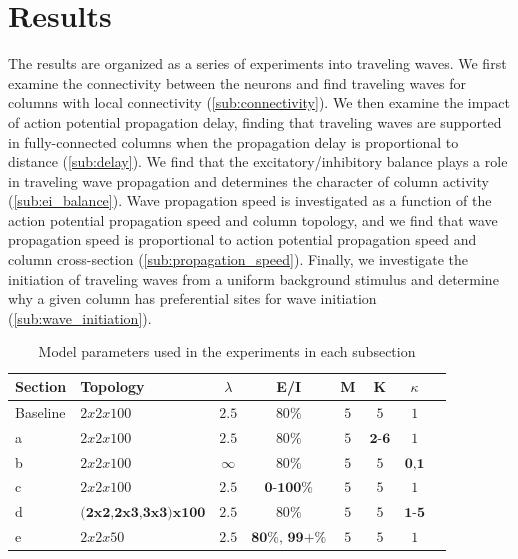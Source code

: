 \documentclass[a4paper,11pt]{article}
\begin{document}
\section{Results}
The results are organized as a series of experiments into traveling waves.
We first examine the connectivity between the neurons and find traveling waves for columns with local connectivity (\ref{sub:connectivity}).
We then examine the impact of action potential propagation delay, finding that traveling waves are supported in fully-connected columns when the propagation delay is proportional to distance (\ref{sub:delay}).
We find that the excitatory/inhibitory balance plays a role in traveling wave propagation and determines the character of column activity (\ref{sub:ei_balance}).
Wave propagation speed is investigated as a function of the action potential propagation speed and column topology, and we find that wave propagation speed is proportional to action potential propagation speed and column cross-section (\ref{sub:propagation_speed}).
Finally, we investigate the initiation of traveling waves from a uniform background stimulus and determine why a given column has preferential sites for wave initiation (\ref{sub:wave_initiation}).

\begin{table}[!htb]
 \caption{Model parameters used in the experiments in each subsection}
 \label{tab:experiment_params}
 \centering
 \begin{tabularx}{\textwidth}{l | X | c | c | c | c | c | r}
  \textbf{Section} & \textbf{Topology} & \textbf{$\lambda$} & \textbf{E/I} & \textbf{M} & \textbf{K} & \textbf{$\kappa$} \\
  \hline
  Baseline & $2x2x100$ & $2.5$ & $80\%$ & $5$ & $5$ & $1$ \\ 
  a & $2x2x100$ & $2.5$ & $80\%$ & $5$ & $\textbf{2-6}$ & $1$ \\ 
  b & $2x2x100$ & $\infty$ & $80\%$ & $5$ & $5$ & $\textbf{0,1}$ \\ 
  c & $2x2x100$ & $2.5$ & $\textbf{0-100}\%$ & $5$ & $5$ & $1$ \\ 
  d & $\textbf{(2x2,2x3,3x3)x100}$ & $2.5$ & $80\%$ & $5$ & $5$ & $\textbf{1-5}$ \\ 
  e & $2x2x50$ & $2.5$ & $\textbf{80\% , 99+\%}$ & $5$ & $5$ & $1$ \\ 
 \end{tabularx}
\end{table}
\end{document}

